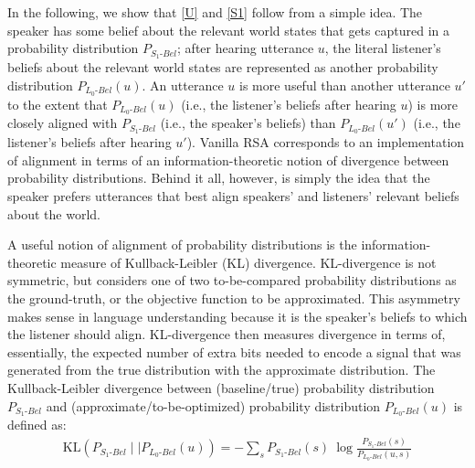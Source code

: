 \documentclass{sp}
\newcommand{\mf}[1]{\textcolor{orange}{[mf: #1]}}
\begin{document}
In the following, we show that \eqref{U} and \eqref{S1} follow from a simple idea.
The speaker has some belief about the relevant world states that gets captured in a probability distribution $P_{S_{1}\text{-}Bel}$;
after hearing utterance $u$, the literal listener's beliefs about the relevant world states are
represented as another probability distribution $P_{L_{0}\text{-}Bel}(u)$. An utterance $u$ is more useful
than another utterance $u'$ to the extent that $P_{L_{0}\text{-}Bel}(u)$  (i.e., the listener's beliefs after hearing $u$) is
more closely aligned with $P_{S_{1}\text{-}Bel}$ (i.e., the speaker's beliefs) than
$P_{L_{0}\text{-}Bel}(u')$  (i.e., the listener's beliefs after hearing $u'$).
Vanilla RSA corresponds to an implementation of alignment in terms of an information-theoretic notion of divergence between probability distributions.
Behind it all, however, is simply the idea that the speaker prefers
utterances that best align speakers' and listeners' relevant beliefs about the world.

A useful notion of alignment of probability distributions is the information-theoretic
measure of Kullback-Leibler (KL) divergence. KL-divergence is not symmetric, but considers one of
two to-be-compared probability distributions as the ground-truth, or the objective function
to be approximated.
This asymmetry makes sense in language understanding because it is the speaker's
beliefs to which the listener should align. KL-divergence then measures divergence in terms of,
essentially, the expected number of extra bits needed to encode a signal that was generated
from the true distribution with the approximate distribution. 
The Kullback-Leibler divergence between (baseline/true) probability distribution
$P_{S_{1}\text{-}Bel}$ and (approximate/to-be-optimized) probability distribution
$P_{L_{0}\text{-}Bel}(u)$ is defined as:
\begin{align}
  \label{eq:KL-divergence}
  \text{KL}(P_{S_{1}\text{-}Bel} \mid \mid P_{L_{0}\text{-}Bel}(u)) = - \sum_{s} P_{S_{1}\text{-}Bel}(s) \ \log \frac{P_{S_{1}\text{-}Bel}(s)}{P_{L_{0}\text{-}Bel}(u,s)}
\end{align}
\end{document}
